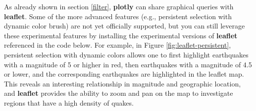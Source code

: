 \documentclass[
  12pt,
]{krantz}
\newenvironment{Shaded}{\begin{snugshade}}{\end{snugshade}}
\newcommand{\CommentTok}[1]{\textcolor[rgb]{0.56,0.35,0.01}{\textit{#1}}}
\newcommand{\DataTypeTok}[1]{\textcolor[rgb]{0.13,0.29,0.53}{#1}}
\newcommand{\DecValTok}[1]{\textcolor[rgb]{0.00,0.00,0.81}{#1}}
\newcommand{\FloatTok}[1]{\textcolor[rgb]{0.00,0.00,0.81}{#1}}
\newcommand{\KeywordTok}[1]{\textcolor[rgb]{0.13,0.29,0.53}{\textbf{#1}}}
\newcommand{\NormalTok}[1]{#1}
\newcommand{\OperatorTok}[1]{\textcolor[rgb]{0.81,0.36,0.00}{\textbf{#1}}}
\newcommand{\OtherTok}[1]{\textcolor[rgb]{0.56,0.35,0.01}{#1}}
\newcommand{\StringTok}[1]{\textcolor[rgb]{0.31,0.60,0.02}{#1}}
\begin{document}
As already shown in section \ref{filter}, \textbf{plotly} can share graphical queries with \textbf{leaflet}. Some of the more advanced features (e.g., persistent selection with dynamic color brush) are not yet officially supported, but you can still leverage these experimental features by installing the experimental versions of \textbf{leaflet} referenced in the code below. For example, in Figure \ref{fig:leaflet-persistent}, persistent selection with dynamic colors allows one to first highlight earthquakes with a magnitude of 5 or higher in red, then earthquakes with a magnitude of 4.5 or lower, and the corresponding earthquakes are highlighted in the leaflet map. This reveals an interesting relationship in magnitude and geographic location, and \textbf{leaflet} provides the ability to zoom and pan on the map to investigate regions that have a high density of quakes.

\begin{Shaded}
\end{Shaded}
\end{document}
